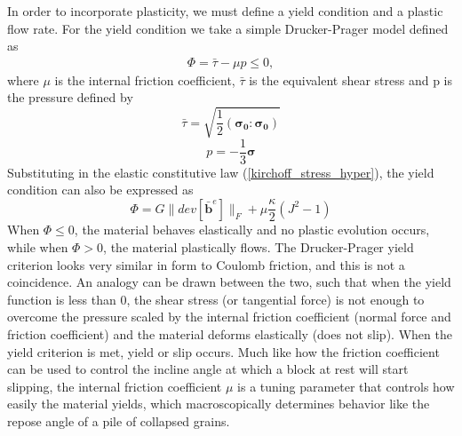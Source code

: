 In order to incorporate plasticity, we must define a yield condition and a plastic flow rate. For the yield condition we take a simple Drucker-Prager model defined as
\begin{align}
\Phi = \bar{\tau} - \mu p \leq 0,
\end{align}
where $\mu$ is the internal friction coefficient, $\bar{\tau}$ is the equivalent shear stress and p is the pressure defined by
\begin{equation}
\bar{\tau}=\sqrt{\frac{1}{2}(\bm{\sigma_0}:\bm{\sigma_0})}\label{tau_bar}
\end{equation}
\begin{equation}
p=-\frac{1}{3}\bm{\sigma}\label{pressure_stress}
\end{equation}
Substituting in the elastic constitutive law (\ref{kirchoff_stress_hyper}), the yield condition can also be expressed as
\begin{equation}
\Phi = G \|  dev[ \bar{\bm{b}}^e ] \|_F + \mu \frac{\kappa}{2} \left( J^2 - 1 \right) \label{yield_hyper_strain}
\end{equation}
When $\Phi \leq 0$, the material behaves elastically and no plastic evolution occurs, while when $\Phi > 0$, the material plastically flows. The Drucker-Prager yield criterion looks very similar in form to Coulomb friction, and this is not a coincidence. An analogy can be drawn between the two, such that when the yield function is less than 0, the shear stress (or tangential force) is not enough to overcome the pressure scaled by the internal friction coefficient (normal force and friction coefficient) and the material deforms elastically (does not slip). When the yield criterion is met, yield or slip occurs. Much like how the friction coefficient can be used to control the incline angle at which a block at rest will start slipping, the internal friction coefficient $\mu$ is a tuning parameter that controls how easily the material yields, which macroscopically determines behavior like the repose angle of a pile of collapsed grains.

